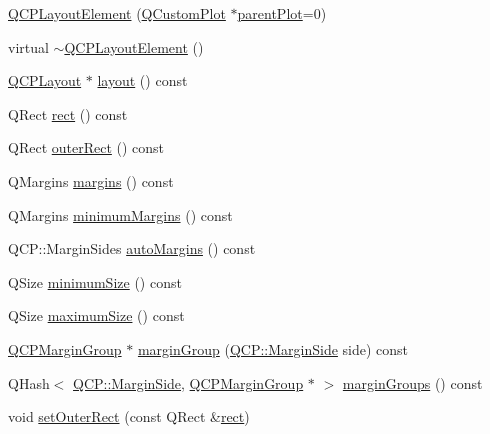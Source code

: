 \begin{DoxyCompactItemize}
\item 
\hyperlink{classQCPLayoutElement_a8947f0ada17e672aaba3d424cbbb67e3}{Q\+C\+P\+Layout\+Element} (\hyperlink{classQCustomPlot}{Q\+Custom\+Plot} $\ast$\hyperlink{classQCPLayerable_ab7e0e94461566093d36ffc0f5312b109}{parent\+Plot}=0)
\item 
virtual \hyperlink{classQCPLayoutElement_a0dc52343920011b3e72d61fc94ed3400}{$\sim$\+Q\+C\+P\+Layout\+Element} ()
\item 
\hyperlink{classQCPLayout}{Q\+C\+P\+Layout} $\ast$ \hyperlink{classQCPLayoutElement_a6235f5384db871fc6e3387a1bc558b0d}{layout} () const 
\item 
Q\+Rect \hyperlink{classQCPLayoutElement_affdfea003469aac3d0fac5f4e06171bc}{rect} () const 
\item 
Q\+Rect \hyperlink{classQCPLayoutElement_a60bbddee2d1230c2414bd776f44d17b8}{outer\+Rect} () const 
\item 
Q\+Margins \hyperlink{classQCPLayoutElement_a85ff977dfcced84eef32d9f819ec9543}{margins} () const 
\item 
Q\+Margins \hyperlink{classQCPLayoutElement_a60ec7f377c26726174d536bffb632002}{minimum\+Margins} () const 
\item 
Q\+C\+P\+::\+Margin\+Sides \hyperlink{classQCPLayoutElement_a2f499b1179b3126e22d0d7508124ccb3}{auto\+Margins} () const 
\item 
Q\+Size \hyperlink{classQCPLayoutElement_ae71f9230171d2d898e21dc461fc3df03}{minimum\+Size} () const 
\item 
Q\+Size \hyperlink{classQCPLayoutElement_a1fc85c79e15c2ab8051eccd455fccc4a}{maximum\+Size} () const 
\item 
\hyperlink{classQCPMarginGroup}{Q\+C\+P\+Margin\+Group} $\ast$ \hyperlink{classQCPLayoutElement_a22cb1bb62c452fd802e43ca2524660db}{margin\+Group} (\hyperlink{namespaceQCP_a7e487e3e2ccb62ab7771065bab7cae54}{Q\+C\+P\+::\+Margin\+Side} side) const 
\item 
Q\+Hash$<$ \hyperlink{namespaceQCP_a7e487e3e2ccb62ab7771065bab7cae54}{Q\+C\+P\+::\+Margin\+Side}, \hyperlink{classQCPMarginGroup}{Q\+C\+P\+Margin\+Group} $\ast$ $>$ \hyperlink{classQCPLayoutElement_ac43921c997570389c14a1671bc3ea499}{margin\+Groups} () const 
\item 
void \hyperlink{classQCPLayoutElement_a38975ea13e36de8e53391ce41d94bc0f}{set\+Outer\+Rect} (const Q\+Rect \&\hyperlink{classQCPLayoutElement_affdfea003469aac3d0fac5f4e06171bc}{rect})
\item 

\end{DoxyCompactItemize}
